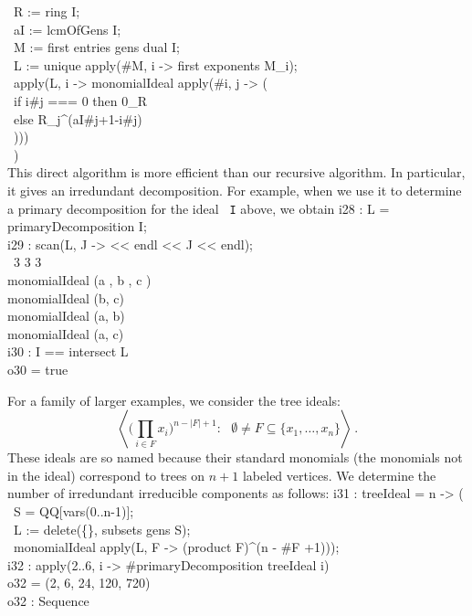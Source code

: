 \           R := ring I;\\
\           aI := lcmOfGens I;\\
\           M := first entries gens dual I;\\
\           L := unique apply(#M, i -> first exponents M_i);\\
\           apply(L, i -> monomialIdeal apply(#i, j -> ( \\
\                          if i#j === 0 then 0_R \\
\                          else R_j^(aI#j+1-i#j)\\
\                          )))\\
\           )\\
\endOutput
This direct algorithm is more efficient than our recursive algorithm.
In particular, it gives an irredundant decomposition.  For example,
when we use it to determine a primary decomposition for the ideal {\tt
I} above, we obtain
\beginOutput
i28 : L = primaryDecomposition I;\\
\endOutput
\beginOutput
i29 : scan(L, J -> << endl << J << endl);\\
\emptyLine
\                3   3   3\\
monomialIdeal (a , b , c )\\
\emptyLine
monomialIdeal (b, c)\\
\emptyLine
monomialIdeal (a, b)\\
\emptyLine
monomialIdeal (a, c)\\
\endOutput
\beginOutput
i30 : I == intersect L\\
\emptyLine
o30 = true\\
\endOutput

For a family of larger examples, we consider the tree
ideals:
\[
\left\langle \big({\textstyle \prod_{i \in F}} x_{i}\big)^{n-|F|+1} :
\text{ $\emptyset \neq F \subseteq \{ x_{1}, \dotsc, x_{n} \}$}
\right\rangle \, .
\]
These ideals are so named because their standard monomials (the
monomials not in the ideal) correspond to trees on $n+1$ labeled
vertices.  We determine the number of irredundant irreducible
components as follows:
\beginOutput
i31 : treeIdeal = n -> (\\
\           S = QQ[vars(0..n-1)];\\
\           L := delete(\{\}, subsets gens S);\\
\           monomialIdeal apply(L, F -> (product F)^(n - #F +1)));\\
\endOutput
\beginOutput
i32 : apply(2..6, i -> #primaryDecomposition treeIdeal i)\\
\emptyLine
o32 = (2, 6, 24, 120, 720)\\
\emptyLine
o32 : Sequence\\
\endOutput


